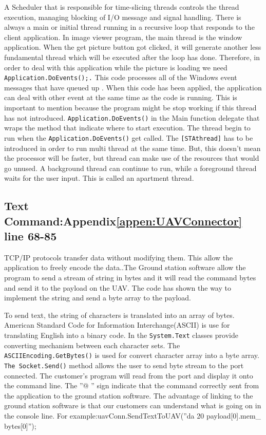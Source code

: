A Scheduler that is responsible for time-slicing threads controls the thread execution, managing blocking of I/O message and signal handling. There is always a main or initial thread running in a recursive loop that responds to the client application\cite{keithC}. In image viewer program, the main thread is the window application. When the get picture button got clicked, it will generate another less fundamental thread which will be executed after the loop has done. Therefore, in order to deal with this application while the picture is loading we need \texttt{Application.DoEvents();.}
 This code processes all of the Windows event messages that have queued up \cite{davidW}. When this code has been applied, the application can deal with other event at the same time as the code is running. This is important to mention because the program might be stop working if this thread has not introduced.
\texttt{Application.DoEvents()} in the Main function delegate that wraps the method that indicate where to start execution. The thread begin to run when the \texttt{Application.DoEvents()} get called\cite{xieX}.
The \texttt{[STAthread]} has to be introduced in order to run multi thread at the same time. But, this doesn't mean the processor will be faster, but thread can make use of the resources that would go unused. A background thread can continue to run, while a foreground thread waits for the user input. This is called an apartment thread. 
        
\subsection{Text Command:Appendix\ref{appen:UAVConnector} line 68-85}
TCP/IP protocols transfer data without modifying them. This allow the application to freely encode the data.\cite{davidB}.The Ground station software allow the program to send a stream of string in bytes and it will read the command bytes and send it to the payload on the UAV. The code has shown the way to implement the string and send a byte array to the payload.

To send text, the string of characters is translated into an array of bytes. American Standard Code for Information Interchange(ASCII) is use for translating English into a binary code. In the \texttt{System.Text} classes provide converting mechanism between each character sets. The \texttt{ASCIIEncoding.GetBytes()} is used for convert character array into a byte array.  
\texttt{The Socket.Send()} method allows the user to send byte stream to the port connected. The customer's program will read from the port and display it onto the command line. The ''@ '' sign indicate that the command correctly sent from the application to the ground station software. The advantage of linking to the ground station software is that our customers can understand what is going on in the console line. For example:uavConn.SendTextToUAV(''da 20 payload[0].mem\_ bytes[0]'');


